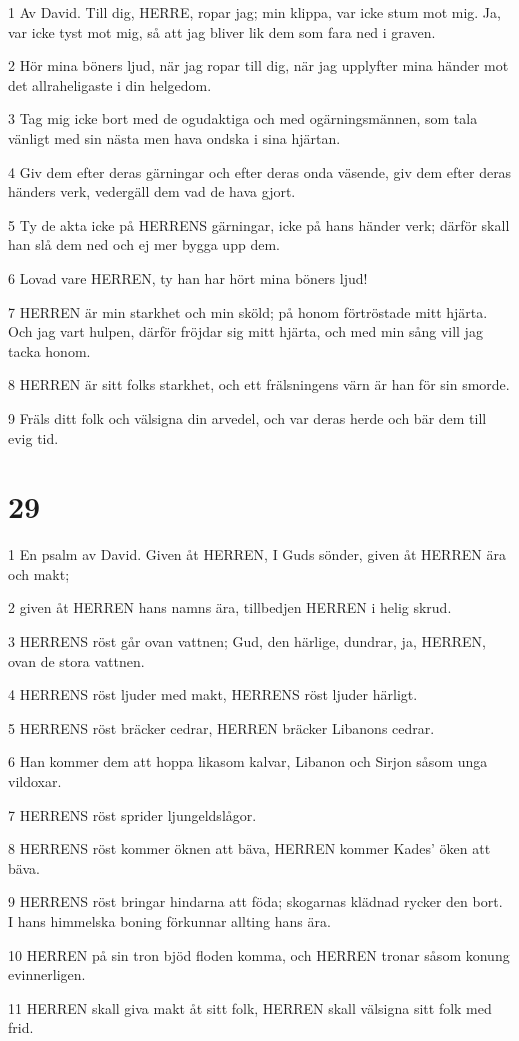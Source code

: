 \par 1 Av David. Till dig, HERRE, ropar jag; min klippa, var icke stum mot mig. Ja, var icke tyst mot mig, så att jag bliver lik dem som fara ned i graven.
\par 2 Hör mina böners ljud, när jag ropar till dig, när jag upplyfter mina händer mot det allraheligaste i din helgedom.
\par 3 Tag mig icke bort med de ogudaktiga och med ogärningsmännen, som tala vänligt med sin nästa men hava ondska i sina hjärtan.
\par 4 Giv dem efter deras gärningar och efter deras onda väsende, giv dem efter deras händers verk, vedergäll dem vad de hava gjort.
\par 5 Ty de akta icke på HERRENS gärningar, icke på hans händer verk; därför skall han slå dem ned och ej mer bygga upp dem.
\par 6 Lovad vare HERREN, ty han har hört mina böners ljud!
\par 7 HERREN är min starkhet och min sköld; på honom förtröstade mitt hjärta. Och jag vart hulpen, därför fröjdar sig mitt hjärta, och med min sång vill jag tacka honom.
\par 8 HERREN är sitt folks starkhet, och ett frälsningens värn är han för sin smorde.
\par 9 Fräls ditt folk och välsigna din arvedel, och var deras herde och bär dem till evig tid.

\chapter{29}

\par 1 En psalm av David. Given åt HERREN, I Guds sönder, given åt HERREN ära och makt;
\par 2 given åt HERREN hans namns ära, tillbedjen HERREN i helig skrud.
\par 3 HERRENS röst går ovan vattnen; Gud, den härlige, dundrar, ja, HERREN, ovan de stora vattnen.
\par 4 HERRENS röst ljuder med makt, HERRENS röst ljuder härligt.
\par 5 HERRENS röst bräcker cedrar, HERREN bräcker Libanons cedrar.
\par 6 Han kommer dem att hoppa likasom kalvar, Libanon och Sirjon såsom unga vildoxar.
\par 7 HERRENS röst sprider ljungeldslågor.
\par 8 HERRENS röst kommer öknen att bäva, HERREN kommer Kades' öken att bäva.
\par 9 HERRENS röst bringar hindarna att föda; skogarnas klädnad rycker den bort. I hans himmelska boning förkunnar allting hans ära.
\par 10 HERREN på sin tron bjöd floden komma, och HERREN tronar såsom konung evinnerligen.
\par 11 HERREN skall giva makt åt sitt folk, HERREN skall välsigna sitt folk med frid.

